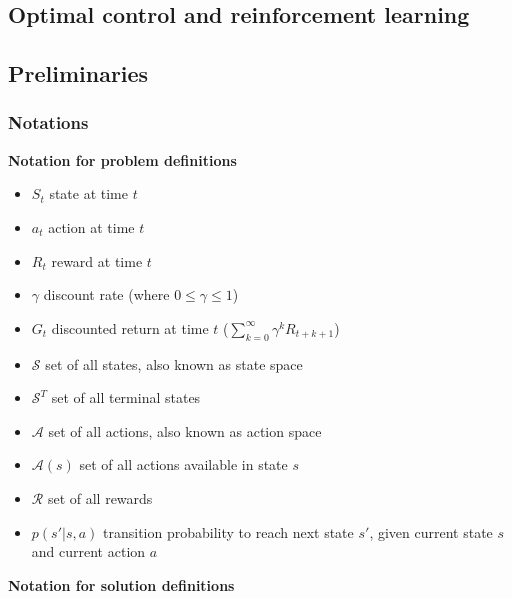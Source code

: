 \begin{refsection}
\printbibliography


\chapter{Optimal control and reinforcement learning}\label{ch:reinforcement-learning}

\section{Preliminaries}

\subsection{Notations}

\textbf{Notation for problem definitions}
\begin{itemize}
	\item[] $S_t$ \tabto{2cm} state at time $t$
	\item[] $a_t$ \tabto{2cm} action at time $t$
	\item[] $R_t$ \tabto{2cm} reward at time $t$
	\item[] $\gamma$ \tabto{2cm} discount rate (where $0 \leq \gamma \leq 1$)
	\item[] $G_t$ \tabto{2cm} discounted return at time $t$ ($\sum_{k=0}^\infty \gamma^k R_{t+k+1}$)
	\item[] $\mathcal{S}$ \tabto{2cm} set of all states, also known as state space
	\item[] $\mathcal{S}^T$ \tabto{2cm} set of all terminal states
	\item[] $\mathcal{A}$ \tabto{2cm} set of all actions, also known as action space 
	\item[] $\mathcal{A}(s)$ \tabto{2cm} set of all actions available in state $s$
	\item[] $\mathcal{R}$ \tabto{2cm} set of all rewards
	\item[] $p(s'|s,a)$ \tabto{2cm} transition probability to reach next state $s'$, given current state $s$ and current action $a$ 
\end{itemize}

\textbf{Notation for solution definitions}


\end{refsection}
